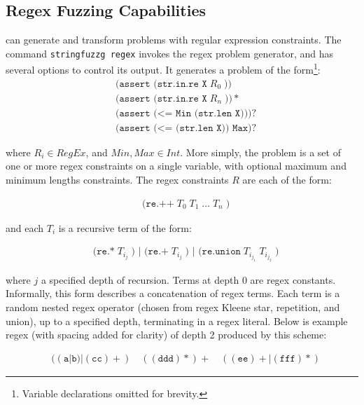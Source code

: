     \subsection{Regex Fuzzing Capabilities}

        \fuzzer{} can generate and transform problems with regular expression constraints. The command \texttt{stringfuzzg regex} invokes the regex problem generator, and has several options to control its output. It generates a problem of the form\footnote{Variable declarations omitted for brevity.}:
        \begin{align*}
            & \texttt{(assert (str.in.re X}\; R_0\; \texttt{))} \\
            & \texttt{(assert (str.in.re X}\; R_n\; \texttt{))}* \\
            & \texttt{(assert (<= Min (str.len X)))}? \\
            & \texttt{(assert (<= (str.len X)) Max)}?
        \end{align*}

        where $R_i \in RegEx$, and $Min, Max \in Int$. More simply, the problem is a set of one or more regex constraints on a single variable, with optional maximum and minimum lengths constraints. The regex constraints $R$ are each of the form:

        \begin{align*}
            & \texttt{(re.++}\; T_0\; T_1\; \texttt{...}\; T_n\; \texttt{)}
        \end{align*}

        and each $T_i$ is a recursive term of the form:

        \begin{align*}
            & \texttt{(re.*}\; T_{i_j}\; \texttt{) | (re.+}\; T_{i_j}\; \texttt{) | (re.union}\; T_{i_{j_1}}\; T_{i_{j_2}}\; \texttt{)}
        \end{align*}

        where $j$ a specified depth of recursion. Terms at depth 0 are regex constants. Informally, this form describes a concatenation of regex terms. Each term is a random nested regex operator (chosen from regex Kleene star, repetition, and union), up to a specified depth, terminating in a regex literal. Below is example regex (with spacing added for clarity) of depth 2 produced by this scheme:

        \begin{align*}
            & ((\texttt{a}|\texttt{b})|(\texttt{cc})+)\quad ((\texttt{ddd})*)+\quad ((\texttt{ee})+|(\texttt{fff})*)
        \end{align*}

